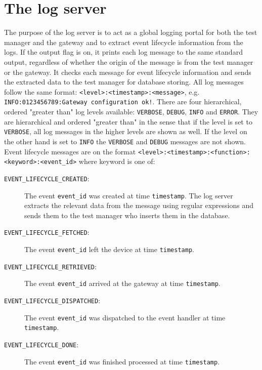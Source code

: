 \section{The log server}
\label{sec:log_server}

The purpose of the log server is to act as a global logging portal for both the
test manager and the gateway and to extract event lifecycle information from
the logs. If the output flag is on, it prints each log message to the same
standard output, regardless of whether the origin of the message is from the
test manager or the gateway. It checks each message for event lifecycle
information and sends the extracted data to the test manager for database
storing. All log messages follow the same format:
\texttt{<level>:<timestamp>:<message>}, e.g. \texttt{INFO:0123456789:Gateway
configuration ok!}. There are four hierarchical, ordered "greater than" log
levels available: \texttt{VERBOSE}, \texttt{DEBUG}, \texttt{INFO} and
\texttt{ERROR}. They are hierarchical and ordered "greater than" in the sense
that if the level is set to \texttt{VERBOSE}, all log messages in the higher
levels are shown as well. If the level on the other hand is set to
\texttt{INFO} the \texttt{VERBOSE} and \texttt{DEBUG} messages are not shown.
Event lifecycle messages are on the format
\texttt{<level>:<timestamp>:<function>:<keyword>:<event\_id>} where keyword is
one of:

\begin{description}

\item[\texttt{EVENT\_LIFECYCLE\_CREATED}:] The event \texttt{event\_id} was
created at time \texttt{timestamp}. The log server extracts the relevant data
from the message using regular expressions and sends them to the test manager
who inserts them in the database.

\item[\texttt{EVENT\_LIFECYCLE\_FETCHED}:] The event \texttt{event\_id} left
the device at time \texttt{timestamp}.

\item[\texttt{EVENT\_LIFECYCLE\_RETRIEVED}:] The event \texttt{event\_id}
arrived at the gateway at time \texttt{timestamp}.

\item[\texttt{EVENT\_LIFECYCLE\_DISPATCHED}:] The event \texttt{event\_id} was
dispatched to the event handler at time \texttt{timestamp}.

\item[\texttt{EVENT\_LIFECYCLE\_DONE}:] The event \texttt{event\_id} was
finished processed at time \texttt{timestamp}.

\end{description}

